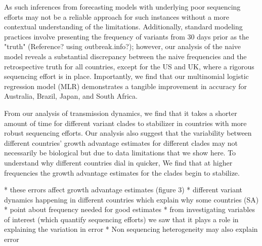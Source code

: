\documentclass[11pt,oneside,letterpaper]{article}
\begin{document}


As such inferences from forecasting models with underlying poor sequencing efforts may not be a reliable approach for such instances without a more contextual understanding of the limitations.
Additionally, standard modeling practices involve presenting the frequency of variants from 30 days prior as the "truth" (Reference? using outbreak.info?); however, our analysis of the naive model reveals a substantial discrepancy between the naive frequencies and the retrospective truth for all countries, except for the US and UK, where a rigorous sequencing effort is in place. 
Importantly, we find that our multinomial logistic regression model (MLR) demonstrates a tangible improvement in accuracy for Australia, Brazil, Japan, and South Africa.


From our analysis of transmission dynamics, we find that it takes a shorter amount of time for different variant clades to stabilizer in countries with more robust sequencing efforts. 
Our analysis also suggest that the variability between different countries' growth advantage estimates for different clades may not necessarily be biological but due to data limitations that we show here.
To understand why different countries dial in quicker, We find that at higher frequencies the growth advantage estimates for the clades begin to stabilize. 

* these errors affect growth advantage estimates  (figure 3)
* different variant dynamics happening in different countries which explain why some countries (SA)
* point about frequency needed for good estimates
* from investigating variables of interest (which quantify sequencing efforts) we saw that it plays a role in explaining the variation in error
* Non sequencing heterogeneity may also explain error


\end{document}
